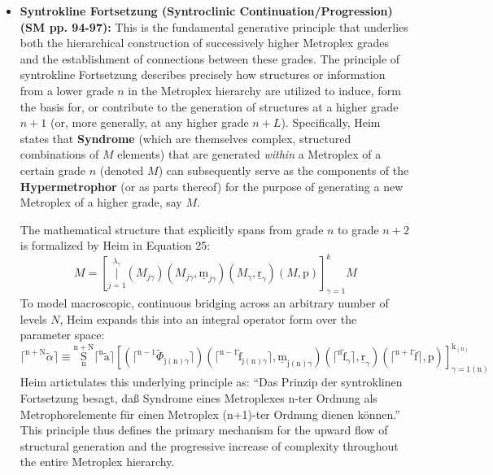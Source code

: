 \documentclass[12pt]{article}
\newcommand{\q}[1]{\enquote{#1}}
\def\metroplex#1#2{M}%
\begin{document}
\begin{itemize}
    \item \textbf{Syntrokline Fortsetzung (Syntroclinic Continuation/Progression) (SM pp. 94-97):}
    This is the fundamental generative principle that underlies both the hierarchical construction of successively higher Metroplex grades and the establishment of connections between these grades. The principle of syntrokline Fortsetzung describes precisely how structures or information from a lower grade \( n \) in the Metroplex hierarchy are utilized to induce, form the basis for, or contribute to the generation of structures at a higher grade \( n+1 \) (or, more generally, at any higher grade \( n+L \)). Specifically, Heim states that \textbf{Syndrome} (which are themselves complex, structured combinations of \( \metroplex{n-1}{} \) elements) that are generated \textit{within} a Metroplex of a certain grade \( n \) (denoted \( \metroplex{n}{} \)) can subsequently serve as the components of the \textbf{Hypermetrophor} (or as parts thereof) for the purpose of generating a new Metroplex of a higher grade, say \( \metroplex{n+1}{} \). 
    
    The mathematical structure that explicitly spans from grade \( n \) to grade \( n+2 \) is formalized by Heim in Equation 25:
    \begin{equation}
\metroplex{n+2}{\alpha} = \left[ \underset{j=1}{\overset{\lambda_\gamma}{\big|}} \left( \metroplex{n-1}{\phi}_{j\gamma} \right) \left( \metroplex{n-1}{f}_{j\gamma}, \underline{\mathrm{m}}_{j\gamma} \right) \left( \metroplex{n}{f}_\gamma, \underline{\mathrm{r}}_\gamma \right) \left( \metroplex{n+1}{f}, \mathrm{p} \right) \right]_{\gamma=1}^k \metroplex{n}{a}
\label{eq:original_syntroclinic_bridge_25}
\tag{25}
\end{equation}
    To model macroscopic, continuous bridging across an arbitrary number of levels \( N \), Heim expands this into an integral operator form over the parameter space:
    \begin{equation}
\lceil^{\mathrm{n}+\mathrm{N}} \tilde{\alpha} \rceil \equiv \underset{\mathrm{n}}{\overset{\mathrm{n}+\mathrm{N}}{\mathrm{S}}} \lceil^\mathrm{n} \tilde{\mathrm{a}} \rceil \left[ \left( \lceil^{\mathrm{n}-1} \tilde{\Phi}_{\mathrm{j(n)}\gamma} \rceil \right) \left( \lceil^{\mathrm{n}-1} \tilde{\mathrm{f}}_{\mathrm{j(n)}\gamma} \rceil, \underline{\mathrm{m}}_{\mathrm{j(n)}\gamma} \right) \left( \lceil^\mathrm{n} \tilde{\mathrm{f}}_\gamma \rceil, \underline{\mathrm{r}}_\gamma \right) \left( \lceil^{\mathrm{n}+1} \tilde{\mathrm{f}} \rceil, \mathrm{p} \right) \right]_{\gamma=1\mathrm{(n)}}^{\mathrm{k}_{\mathrm{(n)}}}
\tag{25a}
\end{equation}
    Heim artictulates this underlying principle as: \q{Das Prinzip der syntroklinen Fortsetzung besagt, daß Syndrome eines Metroplexes n-ter Ordnung als Metrophorelemente für einen Metroplex (n+1)-ter Ordnung dienen können.} This principle thus defines the primary mechanism for the upward flow of structural generation and the progressive increase of complexity throughout the entire Metroplex hierarchy.


\end{itemize}
\end{document}
